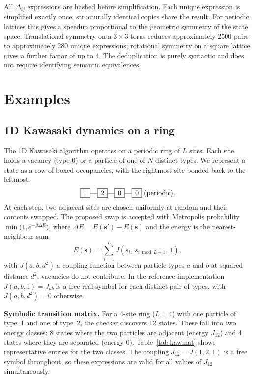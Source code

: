 \documentclass[twocolumn,10pt]{article}
\newcommand{\lsite}[1]{\fbox{\ensuremath{\,#1\,}}}
\newcommand{\Mf}[1]{\min\!\bigl(1,e^{#1}\bigr)}
\begin{document}
All $\Delta_{ij}$ expressions are hashed before simplification.  Each unique
expression is simplified exactly once; structurally identical copies share the
result.  For periodic lattices this gives a speedup proportional to the
geometric symmetry of the state space.  Translational symmetry on a $3\times3$
torus reduces approximately 2500 pairs to approximately 280 unique expressions;
rotational symmetry on a square lattice gives a further factor of up to 4.  The
deduplication is purely syntactic and does not require identifying semantic
equivalences.

\section{Examples}

\subsection{1D Kawasaki dynamics on a ring}
\label{sec:kawasaki}

The 1D Kawasaki algorithm operates on a periodic ring of $L$ sites.  Each site
holds a vacancy (type $0$) or a particle of one of $N$ distinct types.  We
represent a state as a row of boxed occupancies, with the rightmost site bonded
back to the leftmost:
\[
  \lsite{1}\text{---}\lsite{2}\text{---}\lsite{0}\text{---}\lsite{0}
  \;\text{(periodic)}.
\]
At each step, two adjacent sites are chosen uniformly at random and their
contents swapped.  The proposed swap is accepted with Metropolis probability
$\Mf{-\beta\Delta E}$, where $\Delta E = E(\mathbf{s}')-E(\mathbf{s})$ and the
energy is the nearest-neighbour sum
\begin{equation}
  E(\mathbf{s}) = \sum_{i=1}^{L} J\!\left(s_i,\, s_{i\bmod L+1},\, 1\right),
  \label{eq:kawenergy}
\end{equation}
with $J(a,b,d^2)$ a coupling function between particle types $a$ and $b$ at
squared distance $d^2$; vacancies do not contribute.  In the reference
implementation $J(a,b,1)=J_{ab}$ is a free real symbol for each distinct pair
of types, with $J(a,b,d^2)=0$ otherwise.

\smallskip\noindent\textbf{Symbolic transition matrix.}
For a 4-site ring ($L=4$) with one particle of type~1 and one of type~2, the
checker discovers 12 states.  These fall into two energy classes: 8 states
where the two particles are adjacent (energy $J_{12}$) and 4 states where they
are separated (energy $0$).  Table~\ref{tab:kawmat} shows representative
entries for the two classes.  The coupling $J_{12} = J(1,2,1)$ is a free
symbol throughout, so these expressions are valid for all values of $J_{12}$
simultaneously.
\end{document}
